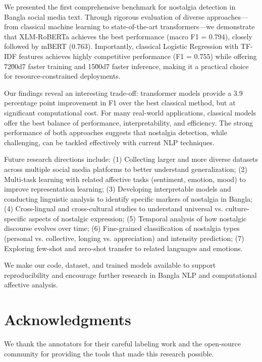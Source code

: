 \documentclass[conference]{IEEEtran}
\begin{document}
We presented the first comprehensive benchmark for nostalgia detection in Bangla social media text. Through rigorous evaluation of diverse approaches—from classical machine learning to state-of-the-art transformers—we demonstrate that XLM-RoBERTa achieves the best performance (macro F1 = 0.794), closely followed by mBERT (0.763). Importantly, classical Logistic Regression with TF-IDF features achieves highly competitive performance (F1 = 0.755) while offering 72\u00d7 faster training and 15\u00d7 faster inference, making it a practical choice for resource-constrained deployments.

Our findings reveal an interesting trade-off: transformer models provide a 3.9 percentage point improvement in F1 over the best classical method, but at significant computational cost. For many real-world applications, classical models offer the best balance of performance, interpretability, and efficiency. The strong performance of both approaches suggests that nostalgia detection, while challenging, can be tackled effectively with current NLP techniques.

Future research directions include: (1) Collecting larger and more diverse datasets across multiple social media platforms to better understand generalization; (2) Multi-task learning with related affective tasks (sentiment, emotion, mood) to improve representation learning; (3) Developing interpretable models and conducting linguistic analysis to identify specific markers of nostalgia in Bangla; (4) Cross-lingual and cross-cultural studies to understand universal vs. culture-specific aspects of nostalgic expression; (5) Temporal analysis of how nostalgic discourse evolves over time; (6) Fine-grained classification of nostalgia types (personal vs. collective, longing vs. appreciation) and intensity prediction; (7) Exploring few-shot and zero-shot transfer to related languages and emotions.

We make our code, dataset, and trained models available to support reproducibility and encourage further research in Bangla NLP and computational affective analysis.

\section*{Acknowledgments}

We thank the annotators for their careful labeling work and the open-source community for providing the tools that made this research possible.

\renewcommand\refname{References}


\end{document}
